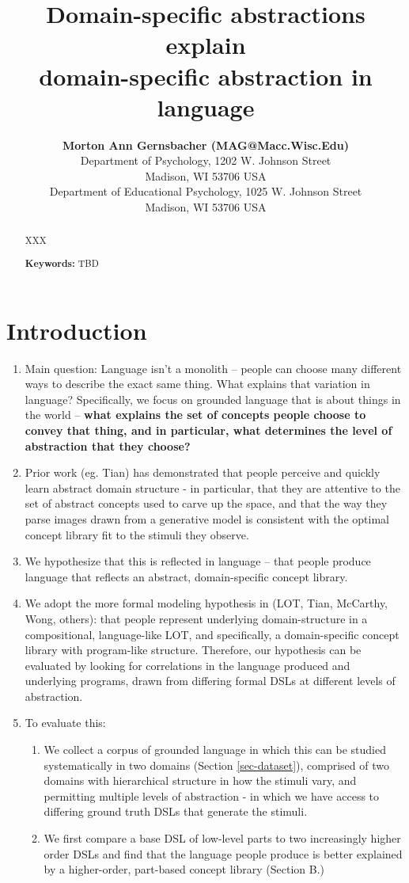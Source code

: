 \documentclass[10pt,letterpaper]{article}
\title{Domain-specific abstractions explain \\ domain-specific abstraction in language}
\author{{\large \bf Morton Ann Gernsbacher (MAG@Macc.Wisc.Edu)} \\
  Department of Psychology, 1202 W. Johnson Street \\
  Madison, WI 53706 USA
  \AND {\large \bf Sharon J.~Derry (SDJ@Macc.Wisc.Edu)} \\
  Department of Educational Psychology, 1025 W. Johnson Street \\
  Madison, WI 53706 USA}
\begin{document}
\maketitle


\begin{abstract}
XXX

\textbf{Keywords:} TBD
\end{abstract}


\section{Introduction} \label{sec-introduction}
\begin{enumerate}
    \item Main question: Language isn’t a monolith -- people can choose many different ways to describe the exact  same thing. What explains that variation in language? Specifically, we focus on grounded language that is about things in the world -- \textbf{what explains the set of concepts people choose to convey that thing, and in particular, what determines the level of abstraction that they choose?}
    \item Prior work (eg. Tian) has demonstrated that people perceive and quickly learn abstract domain structure - in particular, that they are attentive to the set of abstract concepts used to carve up the space, and that the way they parse images drawn from a generative model is consistent with the optimal concept library fit to the stimuli they observe.
    \item We hypothesize that this is reflected in language -- that people produce language that reflects an abstract, domain-specific concept library. 
    \item We adopt the more formal modeling hypothesis in (LOT, Tian, McCarthy, Wong, others): that people represent underlying domain-structure in a compositional, language-like LOT, and specifically, a domain-specific concept library with program-like structure. Therefore, our hypothesis can be evaluated by looking for correlations in the language produced and underlying programs, drawn from differing formal DSLs at different levels of abstraction.
    \item To evaluate this:
        \begin{enumerate}
            \item We collect a corpus of grounded language in which this can be studied systematically in two domains (Section \ref{sec-dataset}), comprised of two domains with hierarchical structure in how the stimuli vary, and permitting multiple levels of abstraction - in which we have access to differing ground truth DSLs that generate the stimuli.
            \item We first compare a base DSL of low-level parts to two increasingly higher order DSLs and find that the language people produce is better explained by a higher-order, part-based concept library (Section B.)

        \end{enumerate}
\end{enumerate}
\end{document}
